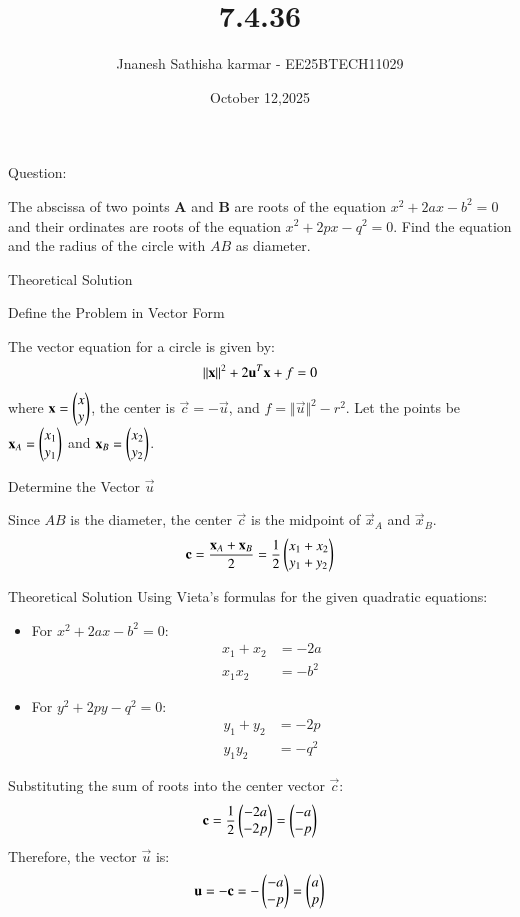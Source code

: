 \documentclass{beamer}
\title %
{7.4.36}
\date{October 12,2025}
\author 
{Jnanesh Sathisha karmar - EE25BTECH11029}
\begin{document}
\frame{\titlepage}
\begin{frame}{Question:}


\noindent The abscissa of two points \textbf{A} and \textbf{B} are roots of the equation $x^2 + 2ax - b^2 = 0$ and their ordinates are roots of the equation $x^2 + 2px - q^2 = 0$. Find the equation and the radius of the circle with $AB$ as diameter.
\end{frame}

\begin{frame}{Theoretical Solution}

 Define the Problem in Vector Form

The vector equation for a circle is given by:
\begin{align*}
    \left\lVert\mathbf{x}\right\rVert^2 + 2\mathbf{u}^T \mathbf{x} + f = 0
\end{align*}
where $\mathbf{x} = \begin{pmatrix}x \\ y\end{pmatrix}$, the center is $\vec{c} = -\vec{u}$, and $f = \Vert \vec{u} \Vert^2 - r^2$.
Let the points be $\mathbf{x}_A = \begin{pmatrix}x_1 \\ y_1\end{pmatrix}$ and $\mathbf{x}_B = \begin{pmatrix}x_2 \\ y_2\end{pmatrix}$.

 Determine the Vector $\vec{u}$

Since $AB$ is the diameter, the center $\vec{c}$ is the midpoint of $\vec{x}_A$ and $\vec{x}_B$.
\begin{align*}
    \mathbf{c} = \frac{\mathbf{x}_A + \mathbf{x}_B}{2} = \frac{1}{2} \begin{pmatrix}x_1 + x_2 \\ y_1 + y_2\end{pmatrix}
\end{align*}
\end{frame}
\begin{frame}{Theoretical Solution}
Using Vieta's formulas for the given quadratic equations:
\begin{itemize}
    \item For $x^2 + 2ax - b^2 = 0$:
        \begin{align*}
            x_1 + x_2 &= -2a \\
            x_1 x_2 &= -b^2
        \end{align*}
    \item For $y^2 + 2py - q^2 = 0$:
        \begin{align*}
            y_1 + y_2 &= -2p \\
            y_1 y_2 &= -q^2
        \end{align*}
\end{itemize}
Substituting the sum of roots into the center vector $\vec{c}$:
\begin{align*}
    \mathbf{c} = \frac{1}{2} \begin{pmatrix}-2a \\ -2p\end{pmatrix} = \begin{pmatrix}-a \\ -p\end{pmatrix}
\end{align*}
Therefore, the vector $\vec{u}$ is:
\begin{align*}
    \mathbf{u} = -\mathbf{c} = - \begin{pmatrix}-a \\ -p\end{pmatrix} = \begin{pmatrix}a \\ p\end{pmatrix}
\end{align*}

\end{frame}
\end{document}
